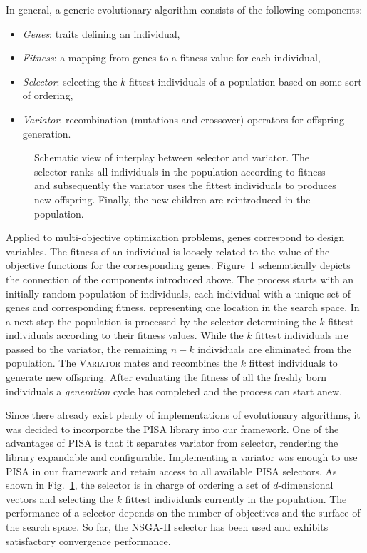 \documentclass[%
preprint,
preprint,
linenumbers,
amsmath,amssymb,
aps,
prstab,
]{revtex4-1}
\begin{document}
In general, a generic evolutionary algorithm consists of the following
  components:
%
\begin{itemize}
  \item \textit{Genes}: traits defining an individual,
  \item \textit{Fitness}: a mapping from genes to a fitness value for each
    individual,
  \item \textit{Selector}: selecting the $k$ fittest individuals of a
    population based on some sort of ordering,
  \item \textit{Variator}: recombination (mutations and crossover) operators
    for offspring generation.
\end{itemize}

\begin{figure}
    \centering
    \scalebox{1}{
    \begin{tikzpicture}[scale=0.8, transform shape, text=black]
    
    \end{tikzpicture}
	}
  \caption{Schematic view of interplay between selector and variator. The
  selector ranks all individuals in the population according to fitness and
  subsequently the variator uses the fittest individuals to produces new
  offspring. Finally, the new children are reintroduced in the population.}
  \label{fig:varsel}
\end{figure}

Applied to multi-objective optimization problems, genes correspond to
  design variables.
The fitness of an individual is loosely related to the value of the objective
  functions for the corresponding genes.
Figure~\ref{fig:varsel} schematically depicts the connection of the
  components introduced above.
The process starts with an initially random population of individuals, each
  individual with a unique set of genes and corresponding fitness,
  representing one location in the search space.
In a next step the population is processed by the selector
  determining the $k$ fittest individuals according to their fitness values.
While the $k$ fittest individuals are passed to the variator, the
  remaining $n-k$ individuals are eliminated from the population.
The \textsc{Variator} mates and recombines the $k$ fittest individuals to
  generate new offspring.
After evaluating the fitness of all the freshly born individuals a
  \textit{generation} cycle has completed and the process can start anew.

Since there already exist plenty of implementations of evolutionary algorithms,
  it was decided to incorporate the PISA library \cite{pisa} into our
  framework.
One of the advantages of PISA is that it separates variator from selector,
  rendering the library expandable and configurable.
Implementing a variator was enough to use PISA in our framework and
  retain access to all available PISA selectors.
As shown in Fig.~\ref{fig:varsel}, the selector is in charge of ordering a
  set of $d$-dimensional vectors and selecting the $k$ fittest individuals
  currently in the population.
The performance of a selector depends on the number of objectives and the
  surface of the search space.
So far, the NSGA-II selector \cite{dpam:02} has been used and exhibits satisfactory
  convergence performance.
\end{document}
